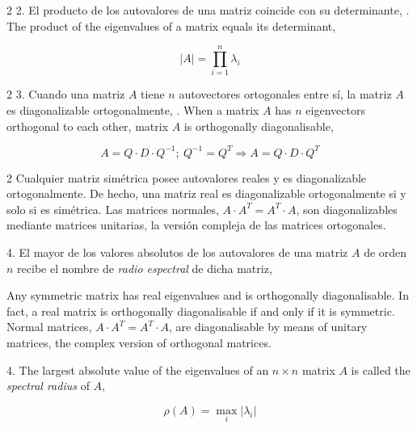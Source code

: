 \begin{paracol}{2}
2. El producto de los autovalores de una matriz coincide con su determinante,
. The product of the eigenvalues of a matrix equals its determinant,
\end{paracol}
\begin{equation*}
\left\vert A \right\vert = \prod_{i=1}^n \lambda_i
\end{equation*} 
\begin{paracol}{2}
3. Cuando una matriz $A$ tiene $n$ autovectores ortogonales entre sí, la matriz $A$ es diagonalizable ortogonalmente,
. When a matrix $A$ has $n$ eigenvectors orthogonal to each other, matrix $A$ is orthogonally diagonalisable,
\end{paracol}
\begin{equation*}
A=Q\cdot D \cdot Q^{-1}; \ Q^{-1}=Q^T \Rightarrow A=Q\cdot D \cdot Q^T
\end{equation*}
\begin{paracol}{2}
Cualquier matriz simétrica posee autovalores reales y es diagonalizable ortogonalmente. De hecho, una matriz real es diagonalizable ortogonalmente si y solo si es simétrica. Las matrices normales, $A\cdot A^T=A^T\cdot A$, son diagonalizables mediante matrices unitarias, la versión compleja de las matrices ortogonales.

4. El mayor de los valores absolutos de los autovalores de una matriz $A$ de orden $n$ recibe el nombre de \emph{radio espectral} de dicha matriz,

\switchcolumn
Any symmetric matrix has real eigenvalues and is orthogonally diagonalisable. In fact, a real matrix is orthogonally diagonalisable if and only if it is symmetric. Normal matrices, $A\cdot A^T=A^T\cdot A$, are diagonalisable by means of unitary matrices, the complex version of orthogonal matrices.

4. The largest absolute value of the eigenvalues of an $n\times n$ matrix $A$ is called the \emph{spectral radius} of $A$,  
\end{paracol}

\begin{equation*}
\rho(A)=\max_{i} \vert \lambda_i \vert
\end{equation*} 



